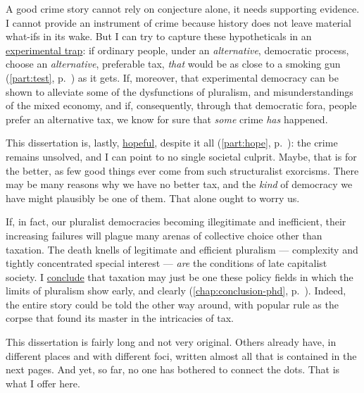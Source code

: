 A good crime story cannot rely on conjecture alone, it needs supporting evidence.
I cannot provide an instrument of crime because history does not leave material what-ifs in its wake.
But I can try to capture these hypotheticals in an \hyperref[part:test]{experimental trap}:
if ordinary %
people, under an \emph{alternative}, democratic process, choose an \emph{alternative}, preferable tax, \emph{that} would be as close to a smoking gun (\autoref{part:test}, p.~\pageref{part:test}) as it gets.
If, moreover, that experimental democracy can be shown to alleviate some of the dysfunctions of pluralism, and misunderstandings of the mixed economy, and if, consequently, through that democratic fora, people prefer an alternative tax, we know for sure that \emph{some} crime \emph{has} happened.

This dissertation is, lastly, \hyperref[part:hope]{hopeful}, despite it all (\autoref{part:hope}, p.~\pageref{part:hope}):
the crime remains unsolved, and I can point to no single societal culprit.
Maybe, that is for the better, as few good things ever come from such structuralist exorcisms.
There may be many reasons why we have no better tax, and the \emph{kind} of democracy we have might plausibly be one of them.
That alone ought to worry us.

If, in fact, our pluralist democracies becoming illegitimate and inefficient, their increasing failures will plague many arenas of collective choice other than taxation.
The death knells of legitimate and efficient pluralism --- complexity and tightly concentrated special interest --- \emph{are} the conditions of late capitalist society.
I \hyperref[chap:conclusion-phd]{conclude} that taxation may just be one these policy fields in which the limits of pluralism show early, and clearly (\autoref{chap:conclusion-phd}, p.~\pageref{chap:conclusion-phd}).
Indeed, the entire story could be told the other way around, with popular rule as the corpse that found its master in the intricacies of tax.

This dissertation is fairly long and not very original.
Others already have, in different places and with different foci, written almost all that is contained in the next \pageref{end} pages.
And yet, so far, no one has bothered to connect the dots.
That is what I offer here.

